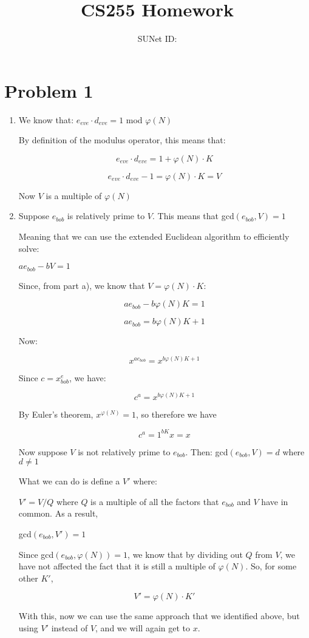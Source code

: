 \documentclass{article}
\title{CS255 Homework \esnumber}
\author{\studentname \qquad SUNet ID: \suid}
\begin{document}
\maketitle

\section*{Problem 1}
\begin{enumerate}
\item %
We know that: $e_{eve} \cdot d_{eve} = 1$ mod $\varphi(N)$

By definition of the modulus operator, this means that:

$$e_{eve} \cdot d_{eve} = 1 + \varphi(N) \cdot K$$

$$e_{eve} \cdot d_{eve} - 1 = \varphi(N) \cdot K = V$$

Now $V$ is a multiple of $\varphi(N)$

\item %

Suppose $e_{bob}$ is relatively prime to $V$. This means that gcd$(e_{bob}, V) = 1$

Meaning that we can use the extended Euclidean algorithm to efficiently solve:

$ae_{bob} - bV = 1$

Since, from part a), we know that $V = \varphi(N) \cdot K$:

$$ae_{bob} - b\varphi(N)K = 1$$

$$ae_{bob}  = b\varphi(N)K + 1$$

Now:

$$x^{ae_{bob}}  = x^{b\varphi(N)K + 1}$$

Since $c = x^e_{bob}$, we have:

$$c^{a}  = x^{b\varphi(N)K + 1}$$

By Euler's theorem, $x^{\varphi(N)} = 1$, so therefore we have

$$c^{a}  = 1^{bK} x = x$$

Now suppose $V$ is not relatively prime to $e_{bob}$. Then: gcd$(e_{bob}, V) = d$ where $d \neq 1$

What we can do is define a $V'$ where:

$V' = V / Q$ where $Q$ is a multiple of all the factors that $e_{bob}$ and $V$ have in common. As a result,

gcd$(e_{bob}, V') = 1$

Since gcd$(e_{bob}, \varphi(N)) = 1$, we know that by dividing out $Q$ from $V$, we have not affected the fact that it is still a multiple of $\varphi(N)$. So, for some other $K'$,

$$V' = \varphi(N) \cdot K'$$

With this, now we can use the same approach that we identified above, but using $V'$ instead of $V$, and we will again get to $x$.

\end{enumerate}
\end{document}
